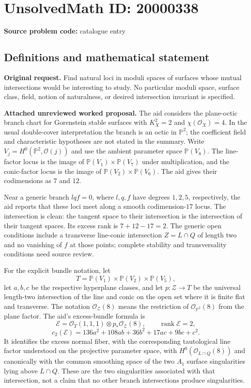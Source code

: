 \documentclass[11pt]{article}
\newcommand{\PP}{\mathbb{P}}
\begin{document}
\section*{UnsolvedMath ID: 20000338}
\textbf{Source problem code:} catalogue entry
\subsection{Definitions and mathematical statement}
\textbf{Original request.} Find natural loci in moduli spaces of surfaces whose mutual intersections would be interesting to study. No particular moduli space, surface class, field, notion of naturalness, or desired intersection invariant is specified.

\textbf{Attached unreviewed worked proposal.} The aid considers the plane-octic branch chart for Gorenstein stable surfaces with $K_X^2=2$ and $\chi(\mathcal O_X)=4$. In the usual double-cover interpretation the branch is an octic in $\PP^2$; the coefficient field and characteristic hypotheses are not stated in the summary. Write $V_j=H^0(\PP^2,\mathcal O(j))$ and use the ambient parameter space $\PP(V_8)$. The line-factor locus is the image of $\PP(V_1)\times\PP(V_7)$ under multiplication, and the conic-factor locus is the image of $\PP(V_2)\times\PP(V_6)$. The aid gives their codimensions as $7$ and $12$.

Near a generic branch $lqf=0$, where $l,q,f$ have degrees $1,2,5$, respectively, the aid reports that these loci meet along a smooth codimension-$17$ locus. The intersection is clean: the tangent space to their intersection is the intersection of their tangent spaces. Its excess rank is $7+12-17=2$. The generic open conditions include a transverse line-conic intersection $Z=L\cap Q$ of length two and no vanishing of $f$ at those points; complete stability and transversality conditions need source review.

For the explicit bundle notation, let
\[T=\PP(V_1)\times\PP(V_2)\times\PP(V_5),\]
let $a,b,c$ be the respective hyperplane classes, and let $p:\mathcal Z\to T$ be the universal length-two intersection of the line and conic on the open set where it is finite flat and transverse. The notation $\mathcal O_{\mathcal Z}(8)$ means the restriction of $\mathcal O_{\PP^2}(8)$ from the plane factor. The aid's excess-bundle formula is
\[\mathcal E=\mathcal O_T(1,1,1)\otimes p_*\mathcal O_{\mathcal Z}(8),\qquad\operatorname{rank}\mathcal E=2,\]
\[c_2(\mathcal E)=136a^2+108ab+36b^2+17ac+9bc+c^2.\]
It identifies the excess normal fiber, with the corresponding tautological line factor understood on the projective parameter space, with $H^0(\mathcal O_{L\cap Q}(8))$ and canonically with the common smoothing space of the two $A_1$ surface singularities lying above $L\cap Q$. These are the two singularities associated with that intersection, not a claim that no other branch intersections produce singularities.
\end{document}
